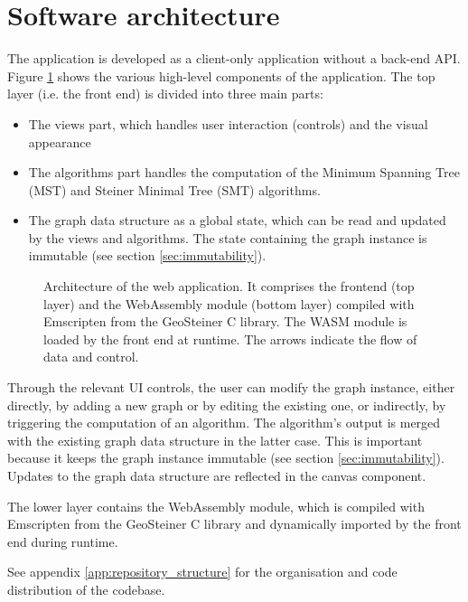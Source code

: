 \documentclass{l4proj}
\begin{document}
\section{Software architecture}
\label{sec:software_architecture}
The application is developed as a client-only application without a back-end API. Figure \ref{fig:architecture} shows the various high-level components of the application. The top layer (i.e. the front end) is divided into three main parts:
\begin{itemize}
    \item The views part, which handles user interaction (controls) and the visual appearance
    \item The algorithms part handles the computation of the Minimum Spanning Tree (MST) and Steiner Minimal Tree (SMT) algorithms.
    \item The graph data structure as a global state, which can be read and updated by the views and algorithms. The state containing the graph instance is immutable (see section \ref{sec:immutability}).
\end{itemize}

\begin{figure}[h]
    \centering
    
    \caption{Architecture of the web application. It comprises the frontend (top layer) and the WebAssembly module (bottom layer) compiled with Emscripten from the GeoSteiner C library. The WASM module is loaded by the front end at runtime. The arrows indicate the flow of data and control.}
    \label{fig:architecture}
\end{figure}

Through the relevant UI controls, the user can modify the graph instance, either directly, by adding a new graph or by editing the existing one, or indirectly, by triggering the computation of an algorithm. The algorithm's output is merged with the existing graph data structure in the latter case. This is important because it keeps the graph instance immutable (see section \ref{sec:immutability}).
Updates to the graph data structure are reflected in the canvas component.

The lower layer contains the WebAssembly module, which is compiled with Emscripten from the GeoSteiner C library and dynamically imported by the front end during runtime.

See appendix \ref{app:repository_structure} for the organisation and code distribution of the codebase.
\end{document}
